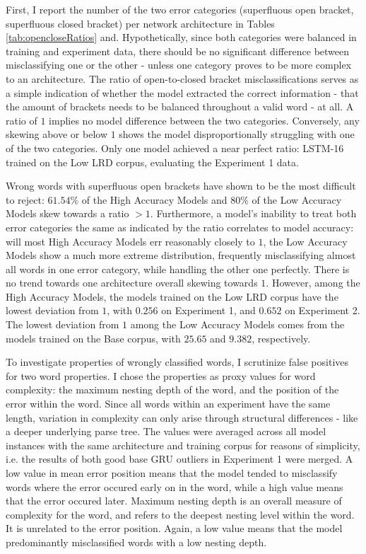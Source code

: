 

First, I report the number of the two error categories (superfluous open bracket, superfluous closed bracket) per network architecture in Tables \ref{tab:opencloseRatios} and. Hypothetically, since both categories were balanced in training and experiment data, there should be no significant difference between misclassifying one or the other - unless one category proves to be more complex to an architecture. The ratio of open-to-closed bracket misclassifications serves as a simple indication of whether the model extracted the correct information - that the amount of brackets needs to be balanced throughout a valid word - at all. A ratio of $1$ implies no model difference between the two categories. Conversely, any skewing above or below $1$ shows the model disproportionally struggling with one of the two categories. Only one model achieved a near perfect ratio: LSTM-16 trained on the Low LRD corpus, evaluating the Experiment 1 data.

Wrong words with superfluous open brackets have shown to be the most difficult to reject: $61.54\%$ of the High Accuracy Models and $80\%$ of the Low Accuracy Models skew towards a ratio $> 1$. Furthermore, a model's inability to treat both error categories the same as indicated by the ratio correlates to model accuracy: will most High Accuracy Models err reasonably closely to $1$, the Low Accuracy Models show a much more extreme distribution, frequently misclassifying almost all words in one error category, while handling the other one perfectly. There is no trend towards one architecture overall skewing towards $1$. However, among the High Accuracy Models, the models trained on the Low LRD corpus have the lowest deviation from $1$, with $0.256$ on Experiment 1, and $0.652$ on Experiment 2. The lowest deviation from $1$ among the Low Accuracy Models comes from the models trained on the Base corpus, with $25.65$ and $9.382$, respectively.

To investigate properties of wrongly classified words, I scrutinize false positives for two word properties. I chose the properties as proxy values for word complexity: the maximum nesting depth of the word, and the position of the error within the word. Since all words within an experiment have the same length, variation in complexity can only arise through structural differences - like a deeper underlying parse tree. The values were averaged across all model instances with the same architecture and training corpus for reasons of simplicity, i.e. the results of both good base GRU outliers in Experiment 1 were merged. A low value in mean error position means that the model tended to misclassify words where the error occured early on in the word, while a high value means that the error occured later. Maximum nesting depth is an overall measure of complexity for the word, and refers to the deepest nesting level within the word. It is unrelated to the error position. Again, a low value means that the model predominantly misclassified words with a low nesting depth.




